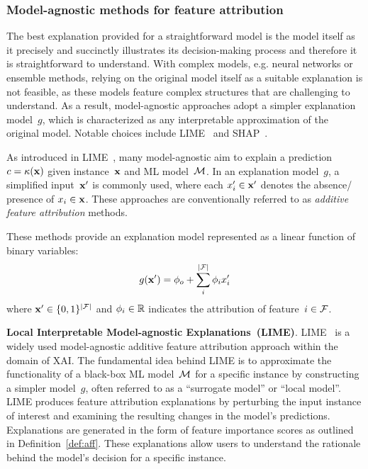 \subsubsection{Model-agnostic methods for feature attribution}

The best explanation provided for a straightforward model is the model itself
as it precisely and succinctly illustrates its decision-making process
and therefore it is straightforward to understand.
%
With complex models, e.g. neural networks or ensemble methods, relying on 
the original model itself as a suitable explanation is not feasible, 
as these models feature complex structures that are challenging to understand.
%
As a result, model-agnostic approaches adopt a simpler explanation model~$g$,
which is characterized as any interpretable approximation of the original model.
%
Notable choices include LIME~\cite{guestrin-kdd16} and SHAP~\cite{lundberg-nips17}.

As introduced in LIME~\cite{guestrin-kdd16}, many model-agnostic  aim to 
explain a prediction $c=\kappa(\mathbf{x})$ given instance~$\mathbf{x}$ and ML
model~${\mathcal{M}}$.
%
In an explanation model~$g$, a simplified input~$\mathbf{x}'$ is commonly used,
where each $x'_i \in \mathbf{x}'$ denotes the absence/ presence of $x_i \in \mathbf{x}$.
%
These approaches are conventionally referred to as
\emph{additive feature attribution} methods.

\begin{definition} \label{def:aff}
	These methods provide an explanation model represented as
	a linear function of binary variables:
	\begin{equation} \label{eq:aff}
		g(\mathbf{x}') = \phi_o + \sum_{i}^{|{\mathcal{F}}|} \phi_i x'_i
	\end{equation}
	where $\mathbf{x}' \in \{0, 1\}^{|{\mathcal{F}}|}$ and $\phi_i \in \mathbb{R}$ indicates
	the attribution of feature~$i \in {\mathcal{F}}$.
\end{definition}


\textbf{Local Interpretable Model-agnostic Explanations~(LIME)}.
LIME~\cite{guestrin-kdd16} is a widely used model-agnostic additive feature 
attribution approach within the domain of XAI. 
%
The fundamental idea behind LIME is to approximate the functionality 
of a black-box ML model~${\mathcal{M}}$ for a specific instance by 
constructing a simpler model~$g$, 
often referred to as a ``surrogate model'' or ``local model''.
%
LIME produces feature attribution explanations by perturbing the input
instance of interest and examining the resulting changes
in the model's predictions.
%
Explanations are generated in the form of feature importance scores
as outlined in Definition~\ref{def:aff}.
%
These explanations allow users to understand the rationale behind the model's
decision for a specific instance.

